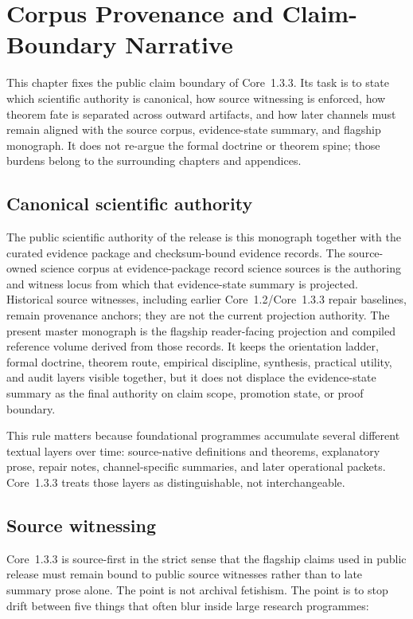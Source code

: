 \section{Corpus Provenance and Claim-Boundary Narrative}
\label{sec:oc13-publication-boundary}

This chapter fixes the public claim boundary of Core~1.3.3. Its task is to state
which scientific authority is canonical, how source witnessing is enforced, how
theorem fate is separated across outward artifacts, and how later channels must
remain aligned with the source corpus, evidence-state summary, and flagship monograph. It does not re-argue the formal doctrine or
theorem spine; those burdens belong to the surrounding chapters and appendices.

\subsection{Canonical scientific authority}

The public scientific authority of the release is this monograph together with the curated evidence package and checksum-bound evidence records. The source-owned science corpus at
evidence-package record science sources is the
authoring and witness locus from which that evidence-state summary is projected. Historical
source witnesses, including earlier Core~1.2/Core~1.3.3 repair baselines, remain
provenance anchors; they are not the current projection authority. The present
master monograph is the flagship reader-facing projection and compiled
reference volume derived from those records. It keeps the orientation ladder,
formal doctrine, theorem route, empirical discipline, synthesis, practical
utility, and audit layers visible together, but it does not displace the evidence-state summary
as the final authority on claim scope, promotion state, or proof boundary.

This rule matters because foundational programmes accumulate several different
textual layers over time: source-native definitions and theorems, explanatory
prose, repair notes, channel-specific summaries, and later operational packets.
Core~1.3.3 treats those layers as distinguishable, not interchangeable.

\subsection{Source witnessing}

Core~1.3.3 is source-first in the strict sense that the flagship claims used in
public release must remain bound to public source witnesses rather than to late
summary prose alone. The point is not archival fetishism. The point is to stop
drift between five things that often blur inside large research programmes:

